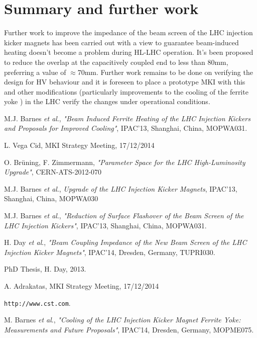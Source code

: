 \documentclass[a4paper,
              ]{jacow}
\begin{document}
\section{Summary and further work}

Further work to improve the impedance of the beam screen of the LHC injection kicker magnets has been carried out with a view to guarantee beam-induced heating doesn't become a problem during HL-LHC operation. It's been proposed to reduce the overlap at the capacitively coupled end to less than 80mm, preferring a value of $\approx$70mm. Further work remains to be done on verifying the design for HV behaviour and it is foreseen to place a prototype MKI with this and other modifications (particularly improvements to the cooling of the ferrite yoke \cite{mkiCooling}) in the LHC verify the changes under operational conditions.


\begin{thebibliography}{9}

M.J. Barnes \emph{et al}., \emph{"Beam Induced Ferrite Heating of the LHC Injection Kickers and Proposals for Improved Cooling"}, IPAC'13, Shanghai, China, MOPWA031.

L. Vega    Cid, MKI Strategy Meeting, 17/12/2014

O. Brüning, F. Zimmermann, \emph{"Parameter Space for the LHC High-Luminosity Upgrade"}, CERN-ATS-2012-070 

M.J. Barnes \emph{et al}., \emph{Upgrade of the LHC Injection Kicker Magnets}, IPAC'13, Shanghai, China, MOPWA030

M.J. Barnes \emph{et al}., \emph{"Reduction of Surface Flashover of the Beam Screen of the LHC Injection Kickers"}, IPAC'13, Shanghai, China, MOPWA031.

H. Day \emph{et al}., \emph{"Beam Coupling Impedance of the New Beam Screen of the LHC Injection Kicker Magnets"}, IPAC'14, Dresden, Germany, TUPRI030.

PhD Thesis, H. Day, 2013.

A. Adrakatas, MKI Strategy Meeting, 17/12/2014

\texttt{http://www.cst.com}.

M. Barnes \emph{et al}., \emph{"Cooling of the LHC Injection Kicker Magnet Ferrite Yoke: Measurements and Future Proposals"}, IPAC'14, Dresden, Germany, MOPME075.


\end{thebibliography}
\end{document}

